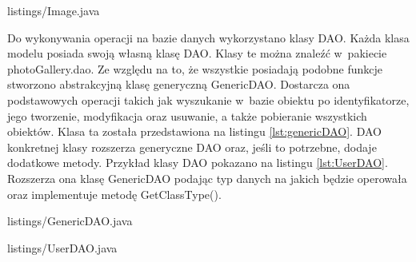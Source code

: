 
{listings/Image.java}

Do wykonywania operacji na bazie danych wykorzystano klasy DAO. Każda klasa
modelu posiada swoją własną klasę DAO. Klasy te można znaleźć w~pakiecie
photoGallery.dao. Ze względu na to, że wszystkie posiadają podobne funkcje
stworzono abstrakcyjną klasę generyczną GenericDAO. Dostarcza ona podstawowych
operacji takich jak wyszukanie w~bazie obiektu po identyfikatorze, jego
tworzenie, modyfikacja oraz usuwanie, a także pobieranie wszystkich obiektów. Klasa ta została przedstawiona na listingu
\ref{lst:genericDAO}. DAO konkretnej klasy rozszerza generyczne DAO oraz, jeśli
to potrzebne, dodaje dodatkowe metody. Przykład klasy DAO pokazano na listingu \ref{lst:UserDAO}. Rozszerza ona klasę GenericDAO podając typ danych na jakich będzie operowała oraz implementuje metodę GetClassType().

\newpage

{listings/GenericDAO.java}


{listings/UserDAO.java}

